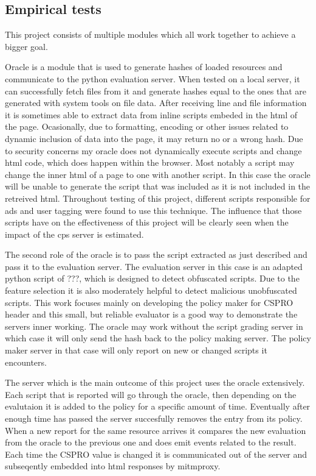 \subsection{Empirical tests}

This project consists of multiple modules which all work together to achieve a bigger goal.

Oracle is a module that is used to generate hashes of loaded resources and communicate to the python evaluation server.
When tested on a local server, it can successfully fetch files from it and generate hashes equal to the ones that are generated with system tools on file data.
After receiving line and file information it is sometimes able to extract data from inline scripts embeded in the html of the page.
Ocasionally, due to formatting, encoding or other issues related to dynamic inclusion of data into the page, it may return no or a wrong hash.
Due to security concerns my oracle does not dynamically execute scripts and change html code, which does happen within the browser.
Most notably a script may change the inner html of a page to one with another script.
In this case the oracle will be unable to generate the script that was included as it is not included in the retreived html.
Throughout testing of this project, different scripts responsible for ads and user tagging were found to use this technique.
The influence that those scripts have on the effectiveness of this project will be clearly seen when the impact of the cps server is estimated.

The second role of the oracle is to pass the script extracted as just described and pass it to the evaluation server.
The evaluation server in this case is an adapted python script of ???, which is designed to detect obfuscated scripts.
Due to the feature selection it is also moderately helpful to detect malicious unobfuscated scripts.
This work focuses mainly on developing the policy maker for CSPRO header and this small, but reliable evaluator is a good way to demonstrate the servers inner working.
The oracle may work without the script grading server in which case it will only send the hash back to the policy making server.
The policy maker server in that case will only report on new or changed scripts it encounters.

The server which is the main outcome of this project uses the oracle extensively.
Each script that is reported will go through the oracle, then depending on the evalutaion it is added to the policy for a specific amount of time.
Eventually after enough time has passed the server succesfully removes the entry from its policy.
When a new report for the same resource arrives it compares the new evaluation from the oracle to the previous one and does emit events related to the result.
Each time the CSPRO value is changed it is communicated out of the server and subseqently embedded into html responses by mitmproxy.

